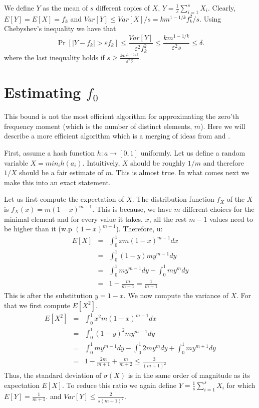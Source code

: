 \documentclass{article}
\newcommand{\eps}{\varepsilon}
\begin{document}
We define $Y$ as the mean of $s$ different copies of $X$, $Y = \frac{1}{s}\sum_{i=1}^{s}X_i$.
Clearly, $E[Y] = E[X] = f_k$ and $Var[Y] \le Var[X]/s =  km^{1-1/k}f_{k}^{2}/s$.
Using Chebyshev's inequality we have that 
\[
\Pr[|Y - f_k| > \eps f_k] \le \frac{Var[Y]}{\eps^2 f_{k}^{2}} \le \frac{km^{1-1/k}}{\eps^2 s} \le \delta.
\]
where the last inequality holds if $ s \ge \frac{km^{1-1/k}}{\eps^2 \delta}$.

\section*{Estimating $f_0$}
This bound is not the most efficient algorithm for approximating the 
zero'th frequency moment (which is the number of distinct elements, $m$).
Here we will describe a more efficient algorithm which is a merging of ideas from \cite{} and \cite{}.

First, assume a hash function $h: a \rightarrow [0,1]$ uniformly.
Let us define a random variable $X = min_{i}h(a_i)$.
Intuitively, $X$ should be roughly $1/m$ and therefore $1/X$ should be a fair estimate of $m$.
This is almost true. In what comes next we make this into an exact statement.


Let us first compute the expectation of $X$. The distribution function $f_X$ of the $X$
is $f_X(x) = m(1-x)^{m-1}$. This is because, we have $m$ different choices for the minimal 
element and for every value it takes, $x$, all the rest $m-1$ values
need to be higher than it (w.p $(1-x)^{m-1}$). Therefore, u:
\begin{eqnarray*}
E[X] &=& \int_{0}^{1} x m (1-x)^{m-1}dx \\
&=& \int_{0}^{1} (1- y) m y^{m-1}dy \\
&=& \int_{0}^{1} m y^{m-1}dy - \int_{0}^{1} m y^{m}dy\\
&=& 1- \frac{m}{m+1} = \frac{1}{m+1}
\end{eqnarray*}
This is after the substitution $y = 1-x$. We now compute the variance of $X$.
For that we first compute $E[X^2]$.
\begin{eqnarray*}
E[X^2] &=& \int_{0}^{1} x^2 m (1-x)^{m-1}dx \\
&=& \int_{0}^{1} (1- y)^2 m y^{m-1}dy \\
&=& \int_{0}^{1} m y^{m-1}dy - \int_{0}^{1} 2 m y^{m}dy + \int_{0}^{1}  m y^{m+1}dy\\
&=& 1- \frac{2m}{m+1} + \frac{m}{m+2} \le \frac{3}{(m+1)^2}
\end{eqnarray*}
Thus, the standard deviation of $\sigma(X)$ is in the same order of magnitude as its expectation $E[X]$.
To reduce this ratio we again define $Y = \frac{1}{s}\sum_{i=1}^{s}X_i$ for which $E[Y] = \frac{1}{m+1}$.
and $Var[Y] \le \frac{2}{s(m+1)^2}$.
\end{document}
